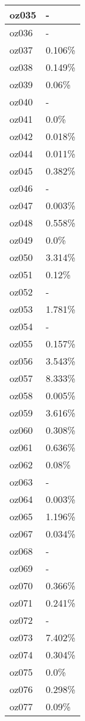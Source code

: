 \documentclass{article}%
\begin{document}
\begin{longtabu}{X[l] X[r]}
\hline%
oz035&{-}\\%
\hline%
oz036&{-}\\%
\hline%
oz037&0.106\%\\%
\hline%
oz038&0.149\%\\%
\hline%
oz039&0.06\%\\%
\hline%
oz040&{-}\\%
\hline%
oz041&0.0\%\\%
\hline%
oz042&0.018\%\\%
\hline%
oz044&0.011\%\\%
\hline%
oz045&0.382\%\\%
\hline%
oz046&{-}\\%
\hline%
oz047&0.003\%\\%
\hline%
oz048&0.558\%\\%
\hline%
oz049&0.0\%\\%
\hline%
oz050&3.314\%\\%
\hline%
oz051&0.12\%\\%
\hline%
oz052&{-}\\%
\hline%
oz053&1.781\%\\%
\hline%
oz054&{-}\\%
\hline%
oz055&0.157\%\\%
\hline%
oz056&3.543\%\\%
\hline%
oz057&8.333\%\\%
\hline%
oz058&0.005\%\\%
\hline%
oz059&3.616\%\\%
\hline%
oz060&0.308\%\\%
\hline%
oz061&0.636\%\\%
\hline%
oz062&0.08\%\\%
\hline%
oz063&{-}\\%
\hline%
oz064&0.003\%\\%
\hline%
oz065&1.196\%\\%
\hline%
oz067&0.034\%\\%
\hline%
oz068&{-}\\%
\hline%
oz069&{-}\\%
\hline%
oz070&0.366\%\\%
\hline%
oz071&0.241\%\\%
\hline%
oz072&{-}\\%
\hline%
oz073&7.402\%\\%
\hline%
oz074&0.304\%\\%
\hline%
oz075&0.0\%\\%
\hline%
oz076&0.298\%\\%
\hline%
oz077&0.09\%\\%

\end{longtabu}
\end{document}
